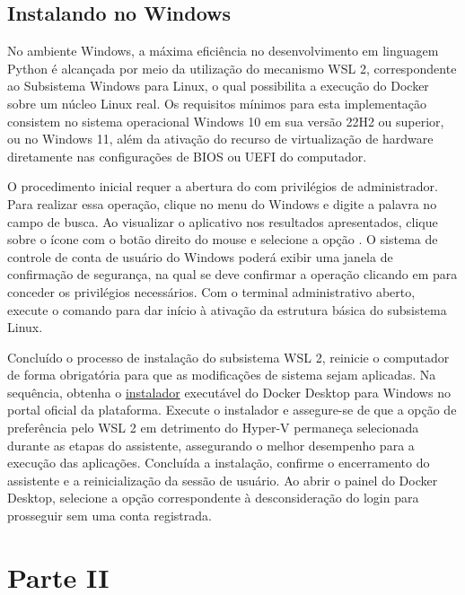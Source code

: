 \subsection*{Instalando no Windows}


No ambiente Windows, a máxima eficiência no desenvolvimento em linguagem Python é alcançada por meio da utilização do mecanismo WSL 2, correspondente ao Subsistema Windows para Linux, o qual possibilita a execução do Docker sobre um núcleo Linux real. Os requisitos mínimos para esta implementação consistem no sistema operacional Windows 10 em sua versão 22H2 ou superior, ou no Windows 11, além da ativação do recurso de virtualização de hardware diretamente nas configurações de BIOS ou UEFI do computador.

O procedimento inicial requer a abertura do  com privilégios de administrador. Para realizar essa operação, clique no menu  do Windows e digite a palavra  no campo de busca. Ao visualizar o aplicativo  nos resultados apresentados, clique sobre o ícone com o botão direito do mouse e selecione a opção . O sistema de controle de conta de usuário do Windows poderá exibir uma janela de confirmação de segurança, na qual se deve confirmar a operação clicando em  para conceder os privilégios necessários. Com o terminal administrativo aberto, execute o comando  para dar início à ativação da estrutura básica do subsistema Linux.

Concluído o processo de instalação do subsistema WSL 2, reinicie o computador de forma obrigatória para que as modificações de sistema sejam aplicadas. Na sequência, obtenha o \href{https://docs.docker.com/desktop/setup/install/windows-install/}{instalador} executável do Docker Desktop para Windows no portal oficial da plataforma. Execute o instalador e assegure-se de que a opção de preferência pelo WSL 2 em detrimento do Hyper-V permaneça selecionada durante as etapas do assistente, assegurando o melhor desempenho para a execução das aplicações. Concluída a instalação, confirme o encerramento do assistente e a reinicialização da sessão de usuário. Ao abrir o painel do Docker Desktop, selecione a opção correspondente à desconsideração do login para prosseguir sem uma conta registrada.

\section*{Parte II}

